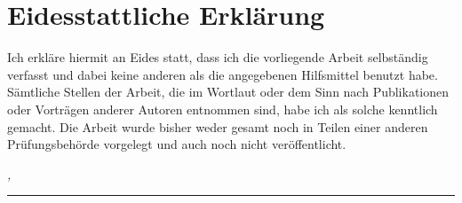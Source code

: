 %
\chapter*{Eidesstattliche Erklärung}
\label{sec:declaration}
\thispagestyle{empty}

Ich erkläre hiermit an Eides statt, dass ich die vorliegende Arbeit selbständig verfasst
und dabei keine anderen als die angegebenen Hilfsmittel benutzt habe. Sämtliche
Stellen der Arbeit, die im Wortlaut oder dem Sinn nach Publikationen oder Vorträgen
anderer Autoren entnommen sind, habe ich als solche kenntlich gemacht. Die Arbeit
wurde bisher weder gesamt noch in Teilen einer anderen Prüfungsbehörde vorgelegt
und auch noch nicht veröffentlicht.

\bigskip

\noindent\textit{\thesisUniversityCity, \thesisDate}

\smallskip

\begin{flushright}
	\begin{minipage}{5cm}
		\rule{\textwidth}{1pt}
		\centering\thesisName
	\end{minipage}
\end{flushright}

